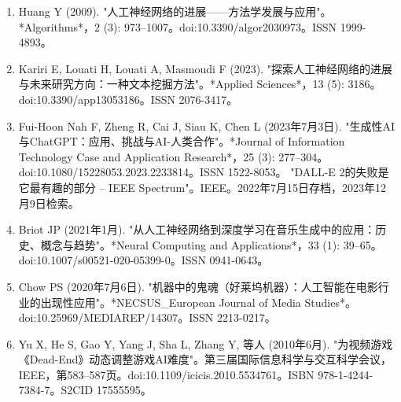 \begin{enumerate}
\item Huang Y (2009). "人工神经网络的进展——方法学发展与应用"。*Algorithms*，2 (3): 973–1007。doi:10.3390/algor2030973。ISSN 1999-4893。  
\item Kariri E, Louati H, Louati A, Masmoudi F (2023). "探索人工神经网络的进展与未来研究方向：一种文本挖掘方法"。*Applied Sciences*，13 (5): 3186。doi:10.3390/app13053186。ISSN 2076-3417。  
\item Fui-Hoon Nah F, Zheng R, Cai J, Siau K, Chen L (2023年7月3日). "生成性AI与ChatGPT：应用、挑战与AI-人类合作"。*Journal of Information Technology Case and Application Research*，25 (3): 277–304。doi:10.1080/15228053.2023.2233814。ISSN 1522-8053。  
"DALL-E 2的失败是它最有趣的部分 – IEEE Spectrum"。IEEE。2022年7月15日存档，2023年12月9日检索。  
\item Briot JP (2021年1月). "从人工神经网络到深度学习在音乐生成中的应用：历史、概念与趋势"。*Neural Computing and Applications*，33 (1): 39–65。doi:10.1007/s00521-020-05399-0。ISSN 0941-0643。  
\item Chow PS (2020年7月6日). "机器中的鬼魂（好莱坞机器）：人工智能在电影行业的出现性应用"。*NECSUS_European Journal of Media Studies*。doi:10.25969/MEDIAREP/14307。ISSN 2213-0217。  
\item Yu X, He S, Gao Y, Yang J, Sha L, Zhang Y, 等人 (2010年6月). "为视频游戏《Dead-End》动态调整游戏AI难度"。第三届国际信息科学与交互科学会议，IEEE，第583–587页。doi:10.1109/icicis.2010.5534761。ISBN 978-1-4244-7384-7。S2CID 17555595。
\end{enumerate}
